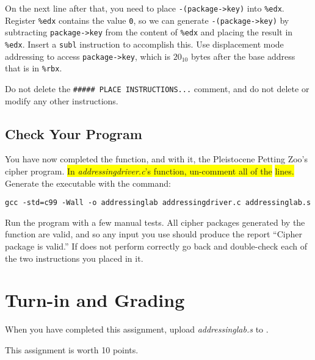 On the next line after that, you need to place \lstinline{-(package->key)} into
\lstinline{%edx}. Register \lstinline{%edx} contains the value \lstinline{0},
so we can generate \lstinline{-(package->key)} by subtracting
\lstinline{package->key} from the content of \lstinline{%edx} and placing the
result in \lstinline{%edx}. Insert a \lstinline{subl} instruction to accomplish
this. Use displacement mode addressing to access \lstinline{package->key}, which
is $20_{10}$ bytes after the base address that is in \lstinline{%rbx}.


Do not delete the \texttt{\#\#\#\#\# PLACE INSTRUCTIONS...} comment, and do not
delete or modify any other instructions.

\subsection*{Check Your Program}

You have now completed the  function, and with it,
the Pleistocene Petting Zoo's cipher program. \colorbox{yellow}{In \textit{addressingdriver.c}'s
 function, un-comment all of the} \colorbox{yellow}{lines.} Generate the executable
with the command:

\texttt{gcc -std=c99 -Wall -o addressinglab addressingdriver.c addressinglab.s}

Run the program with a few manual tests. All cipher packages generated by the
 function are valid, and so any input you use should produce the
report ``Cipher package is valid.'' If  does not
perform correctly go back and double-check each of the two instructions you
placed in it.


\section*{Turn-in and Grading}

When you have completed this assignment, upload \textit{addressinglab.s} to
\filesubmission.

This assignment is worth 10 points. \\

\begin{description}
\end{description}

